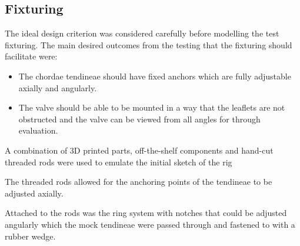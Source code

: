 \subsection{Fixturing}
The ideal design criterion was considered carefully before modelling the test fixturing. The main desired outcomes from the testing that the fixturing should facilitate were:

\begin{itemize}
    \item The chordae tendineae should have fixed anchors which are fully adjustable axially and angularly.
    \item The valve should be able to be mounted in a way that the leaflets are not obstructed and the valve can be viewed from all angles for through evaluation.
\end{itemize}

A combination of 3D printed parts, off-the-shelf components and hand-cut threaded rods were used to emulate the initial sketch of the rig

The threaded rods allowed for the anchoring points of the tendineae to be adjusted axially.

Attached to the rods was the ring system with notches that could be adjusted angularly which the mock tendineae were passed through and fastened to with a rubber wedge.